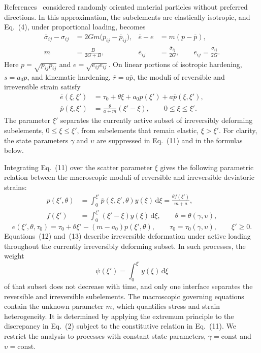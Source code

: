 \documentclass[11pt,a4paper]{article}
\numberwithin{equation}{section}
\newcommand{\dd}{\,\mathrm{d}}
\begin{document}
References~\cite{marina2024,marina1997} considered randomly oriented material particles without preferred directions. In this approximation, the subelements are elastically isotropic, and Eq.~(4), under proportional loading, becomes
\begin{equation}
\begin{aligned}
 \overline\sigma_{ij}-\sigma_{ij}
 &=2Gm\bigl(p_{ij}-\overline p_{ij}\bigr),
 & \overline e-e&=m(p-\overline p),\\
 m&=\frac{B}{2G+B},
 & \overline e_{ij}&=\frac{\overline\sigma_{ij}}{2G},
 \qquad e_{ij}=\frac{\sigma_{ij}}{2G}.
\end{aligned}
\end{equation}
Here $p=\sqrt{p_{ij}p_{ij}}$ and $e=\sqrt{e_{ij}e_{ij}}$. On linear portions of isotropic hardening, $s=a_0p$, and kinematic hardening, $\overline r=a\overline p$, the moduli of reversible and irreversible strain satisfy
\begin{equation}
\begin{aligned}
 \overline e(\xi,\xi')
 &=\tau_0+\theta\xi+a_0p(\xi')+a\overline p(\xi,\xi'),\\
 \overline p(\xi,\xi')
 &=\frac{\theta}{a+m}(\xi'-\xi),
 \qquad 0\leq\xi\leq\xi'.
\end{aligned}
\end{equation}
The parameter $\xi'$ separates the currently active subset of irreversibly deforming subelements, $0\leq\xi\leq\xi'$, from subelements that remain elastic, $\xi>\xi'$. For clarity, the state parameters $\gamma$ and $\upsilon$ are suppressed in Eq.~(11) and in the formulas below.

Integrating Eq.~(11) over the scatter parameter $\xi$ gives the following parametric relation between the macroscopic moduli of reversible and irreversible deviatoric strains:
\begin{equation}
\begin{aligned}
 p(\xi',\theta)
 &=\int_0^{\xi'}\overline p(\xi,\xi',\theta)y(\xi)\dd\xi
 =\frac{\theta f(\xi')}{m+a},\\
 f(\xi')&=\int_0^{\xi'}(\xi'-\xi)y(\xi)\dd\xi,
 \qquad \theta=\theta(\gamma,\upsilon),
\end{aligned}
\end{equation}
\begin{equation}
 e(\xi',\theta,\tau_0)
 =\tau_0+\theta\xi'-(m-a_0)p(\xi',\theta),
 \qquad
 \tau_0=\tau_0(\gamma,\upsilon),
 \qquad \xi'\geq0.
\end{equation}
Equations~(12) and~(13) describe irreversible deformation under active loading throughout the currently irreversibly deforming subset. In such processes, the weight
\[
 \psi(\xi')=\int_0^{\xi'}y(\xi)\dd\xi
\]
of that subset does not decrease with time, and only one interface separates the reversible and irreversible subelements. The macroscopic governing equations contain the unknown parameter $m$, which quantifies stress and strain heterogeneity. It is determined by applying the extremum principle to the discrepancy in Eq.~(2) subject to the constitutive relation in Eq.~(11). We restrict the analysis to processes with constant state parameters, $\gamma=\text{const}$ and $\upsilon=\text{const}$.
\end{document}
